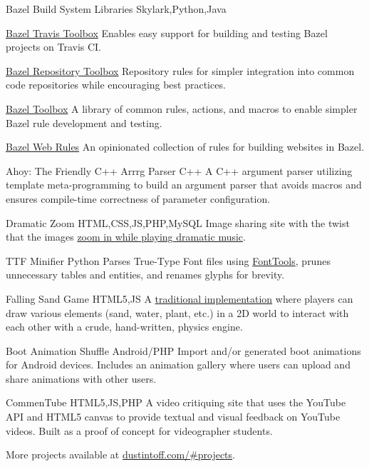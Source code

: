 \personalProject {} {Bazel Build System Libraries} {Skylark,Python,Java} {
    \begin {minimalItemize}
        \item \href {https://github.com/quittle/bazel_travis_toolbox} {Bazel Travis Toolbox} \textendash Enables easy support for building and testing Bazel projects on Travis CI\@.
        \item \href {https://github.com/quittle/bazel_repository_toolbox} {Bazel Repository Toolbox} \textendash Repository rules for simpler integration into common code repositories while encouraging best practices.
        \item \href {https://github.com/quittle/bazel_toolbox} {Bazel Toolbox} \textendash A library of common rules, actions, and macros to enable simpler Bazel rule development and testing.
        \item \href {https://github.com/quittle/rules_web} {Bazel Web Rules} \textendash An opinionated collection of rules for building websites in Bazel.
    \end {minimalItemize}
}

 {Ahoy: The Friendly C++ Arrrg Parser} {C++} {
    A C++ argument parser utilizing template meta-programming to build an argument parser that avoids macros and ensures compile-time correctness of parameter configuration.
}

 {Dramatic Zoom} {HTML,CSS,JS,PHP,MySQL} {
    Image sharing site with the twist that the images \href {https://youtu.be/a1Y73sPHKxw} {zoom in while playing dramatic music}.
}

\personalProject {} {TTF Minifier} {Python} {
    Parses True-Type Font files using \href {https://github.com/fonttools/fonttools} {FontTools}, prunes unnecessary tables and entities, and renames glyphs for brevity.
}

 {Falling Sand Game} {HTML5,JS} {
    A \href {https://en.wikipedia.org/wiki/Falling-sand_game} {traditional implementation} where players can draw various elements (sand, water, plant, etc.) in a 2D world to interact with each other with a crude, hand-written, physics engine.
}

 {Boot Animation Shuffle} {Android/PHP} {
    Import and/or generated boot animations for Android devices. Includes an animation gallery where users can upload and share animations with other users.
}

 {CommenTube} {HTML5,JS,PHP} {
    A video critiquing site that uses the YouTube API and HTML5 canvas to provide textual and visual feedback on YouTube videos. Built as a proof of concept for videographer students.
}

More projects available at {\color {slateblue} \href {http://dustintoff.com/\#projects} {dustintoff.com/\#projects}}.